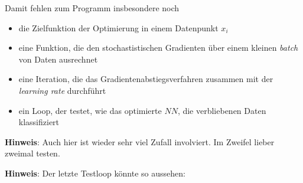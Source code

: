 \documentclass[]{book}
\providecommand{\tightlist}{%
  \setlength{\itemsep}{0pt}\setlength{\parskip}{0pt}}
\theoremstyle{definition}
\theoremstyle{definition}
\theoremstyle{definition}
\theoremstyle{definition}
\theoremstyle{remark}
\begin{document}
Damit fehlen zum Programm insbesondere noch

\begin{itemize}
\tightlist
\item
  die Zielfunktion der Optimierung in einem Datenpunkt \(x_i\)
\item
  eine Funktion, die den stochastistischen Gradienten über einem kleinen \emph{batch} von Daten ausrechnet
\item
  eine Iteration, die das Gradientenabstiegsverfahren zusammen mit der \emph{learning rate} durchführt
\item
  ein Loop, der testet, wie das optimierte \(NN\), die verbliebenen Daten klassifiziert
\end{itemize}

\textbf{Hinweis}: Auch hier ist wieder sehr viel Zufall involviert. Im Zweifel lieber zweimal testen.

\textbf{Hinweis}: Der letzte Testloop könnte so aussehen:
\end{document}
